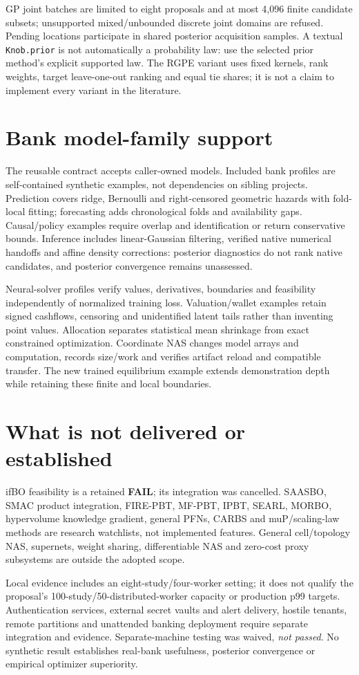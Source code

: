 GP joint batches are limited to eight proposals and at most 4,096 finite
candidate subsets; unsupported mixed/unbounded discrete joint domains are
refused. Pending locations participate in shared posterior acquisition
samples. A textual \texttt{Knob.prior} is not automatically a probability law:
use the selected prior method's explicit supported law. The RGPE variant uses
fixed kernels, rank weights, target leave-one-out ranking and equal tie shares;
it is not a claim to implement every variant in the literature.

\section{Bank model-family support}

The reusable contract accepts caller-owned models. Included bank profiles
are self-contained synthetic examples, not dependencies on sibling projects.
Prediction covers ridge, Bernoulli and right-censored geometric hazards with
fold-local fitting; forecasting adds chronological folds and availability gaps.
Causal/policy examples require overlap and identification or return conservative
bounds. Inference includes linear-Gaussian filtering, verified native numerical
handoffs and affine density corrections: posterior diagnostics do not rank
native candidates, and posterior convergence remains unassessed.

Neural-solver profiles verify values, derivatives, boundaries and feasibility
independently of normalized training loss. Valuation/wallet examples retain
signed cashflows, censoring and unidentified latent tails rather than inventing
point values. Allocation separates statistical mean shrinkage from exact
constrained optimization. Coordinate NAS changes model arrays and computation,
records size/work and verifies artifact reload and compatible transfer. The
new trained equilibrium example extends demonstration depth while retaining
these finite and local boundaries.

\section{What is not delivered or established}

ifBO feasibility is a retained \textbf{FAIL}; its integration was cancelled.
SAASBO, SMAC product integration, FIRE-PBT, MF-PBT, IPBT, SEARL, MORBO,
hypervolume knowledge gradient, general PFNs, CARBS and muP/scaling-law methods
are research watchlists, not implemented features. General cell/topology NAS,
supernets, weight sharing, differentiable NAS and zero-cost proxy subsystems
are outside the adopted scope.

Local evidence includes an eight-study/four-worker setting; it does not qualify
the proposal's 100-study/50-distributed-worker capacity or production p99
targets. Authentication services, external secret vaults and alert delivery,
hostile tenants, remote partitions and unattended banking deployment require
separate integration and evidence. Separate-machine testing was waived,
\emph{not passed}. No synthetic result establishes real-bank usefulness,
posterior convergence or empirical optimizer superiority.
